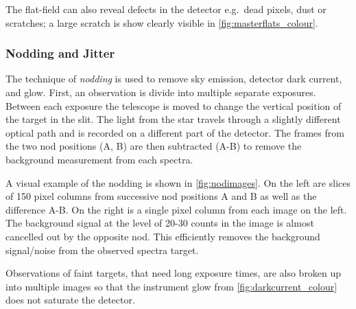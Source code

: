 The flat-field can also reveal defects in the detector e.g.\ dead pixels, dust or scratches; a large scratch is show clearly visible in \cref{fig:masterflats_colour}.

\subsubsection{Nodding and Jitter}
\label{subsec:nod-jitter}
The technique of \emph{nodding} is used to remove sky emission, detector dark current, and glow.
First, an observation is divide into multiple separate exposures.
Between each exposure the telescope is moved to change the vertical position of the target in the slit.
The light from the star travels through a slightly different optical path and is recorded on a different part of the detector.
The frames from the two nod positions (A, B) are then subtracted (A-B) to remove the background measurement from each spectra.

A visual example of the nodding is shown in \cref{fig:nodimages}.
On the left are slices of 150 pixel columns from successive nod positions A and B as well as the difference A-B.
On the right is a single pixel column from each image on the left.
The background signal at the level of 20-30 counts in the image is almost cancelled out by the opposite nod.
This efficiently removes the background signal/noise from the observed spectra target.

Observations of faint targets, that need long exposure times, are also broken up into multiple images so that the instrument glow from \cref{fig:darkcurrent_colour} does not saturate the detector.


